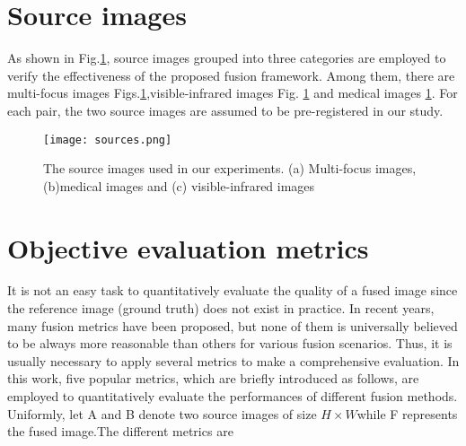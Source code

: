 \section{Source images}
As shown in Fig.\ref{fig:6.1}, source images grouped into three categories are employed to verify the effectiveness of the proposed fusion framework. Among them, there are  multi-focus images Figs.\ref{fig:6.1},visible-infrared images Fig. \ref{fig:6.1}
and  medical images \ref{fig:6.1}. For each pair, the two
source images are assumed to be pre-registered in our study.

\begin{figure}[h!]
  \centering
  \texttt{[image: sources.png]}
  \caption{The source images used in our experiments. (a) Multi-focus images,(b)medical images   and (c) visible-infrared images} \label{fig:6.1}
\end{figure}

\section{Objective evaluation metrics}
It is not an easy task to quantitatively evaluate the quality of a fused image since the reference image (ground truth) does not
exist in practice. In recent years, many fusion metrics have been
proposed, but none of them is universally believed to be always
more reasonable than others for various fusion scenarios. Thus, it is usually necessary to apply several metrics to make a comprehensive evaluation. In this work, five popular metrics, which are briefly introduced as follows, are employed to quantitatively evaluate the performances of different fusion methods. Uniformly, let A and B denote two source images of size \( H \times W \)while F represents the fused image.The different metrics are

